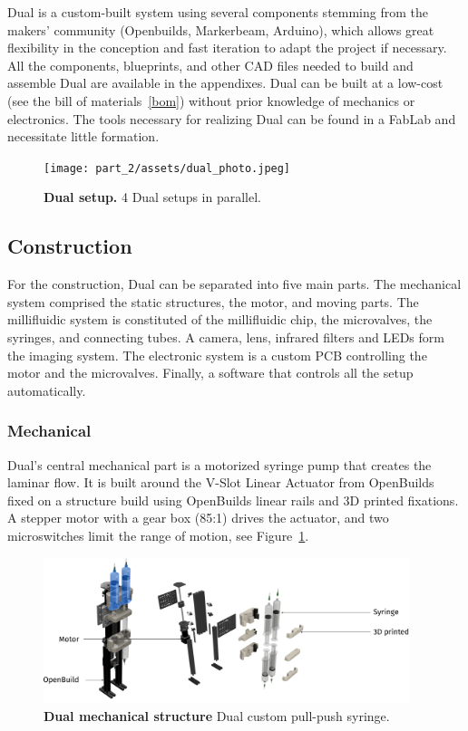   Dual is a custom-built system using several components stemming from the makers' community (Openbuilds, Markerbeam, Arduino), which allows great flexibility in the conception and fast iteration to adapt the project if necessary. All the components, blueprints, and other CAD files needed to build and assemble Dual are available in the appendixes. Dual can be built at a low-cost (see the bill of materials~\ref{bom}) without prior knowledge of mechanics or electronics. The tools necessary for realizing Dual can be found in a FabLab and necessitate little formation.

    \begin{figure}[h]
      \centering
      \texttt{[image: part\_2/assets/dual\_photo.jpeg]}
      \caption{\textbf{Dual setup.} 4 Dual setups in parallel.}
    \end{figure}

  \subsection{Construction}
  For the construction, Dual can be separated into five main parts. The mechanical system comprised the static structures, the motor, and moving parts. The millifluidic system is constituted of the millifluidic chip, the microvalves, the syringes, and connecting tubes. A camera, lens, infrared filters and LEDs form the imaging system. The electronic system is a custom PCB controlling the motor and the microvalves. Finally, a software that controls all the setup automatically.

  \subsubsection{Mechanical}
  Dual's central mechanical part is a motorized syringe pump that creates the laminar flow. It is built around the V-Slot Linear Actuator from OpenBuilds fixed on a structure build using OpenBuilds linear rails and 3D printed fixations. A stepper motor with a gear box (85:1) drives the actuator, and two microswitches limit the range of motion, see Figure~\ref{dual_mechanical}.

    \begin{figure}[h!]
      \centering
      \includegraphics[width=0.95\textwidth]{part_2/assets/pull_push.png}
      \caption{\textbf{Dual mechanical structure} Dual custom pull-push syringe.}
      \label{dual_mechanical}
    \end{figure}

